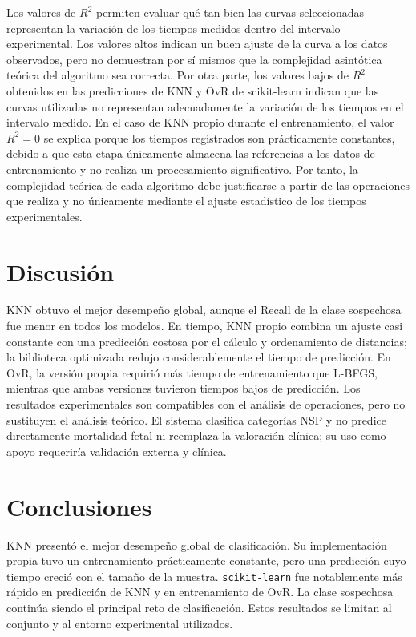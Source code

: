\documentclass[10pt,letterpaper,twocolumn]{article}
\begin{document}
Los valores de $R^2$ permiten evaluar qué tan bien las curvas seleccionadas representan la variación de los tiempos medidos dentro del intervalo experimental. Los valores altos indican un buen ajuste de la curva a los datos observados, pero no demuestran por sí mismos que la complejidad asintótica teórica del algoritmo sea correcta. Por otra parte, los valores bajos de $R^2$ obtenidos en las predicciones de KNN y OvR de scikit-learn indican que las curvas utilizadas no representan adecuadamente la variación de los tiempos en el intervalo medido. En el caso de KNN propio durante el entrenamiento, el valor $R^2 = 0$ se explica porque los tiempos registrados son prácticamente constantes, debido a que esta etapa únicamente almacena las referencias a los datos de entrenamiento y no realiza un procesamiento significativo. Por tanto, la complejidad teórica de cada algoritmo debe justificarse a partir de las operaciones que realiza y no únicamente mediante el ajuste estadístico de los tiempos experimentales.

\section{Discusión}
KNN obtuvo el mejor desempeño global, aunque el Recall de la clase sospechosa fue menor en todos los modelos. En tiempo, KNN propio combina un ajuste casi constante con una predicción costosa por el cálculo y ordenamiento de distancias; la biblioteca optimizada redujo considerablemente el tiempo de predicción. En OvR, la versión propia requirió más tiempo de entrenamiento que L-BFGS, mientras que ambas versiones tuvieron tiempos bajos de predicción. Los resultados experimentales son compatibles con el análisis de operaciones, pero no sustituyen el análisis teórico. El sistema clasifica categorías NSP y no predice directamente mortalidad fetal ni reemplaza la valoración clínica; su uso como apoyo requeriría validación externa y clínica.

\section{Conclusiones}
KNN presentó el mejor desempeño global de clasificación. Su implementación propia tuvo un entrenamiento prácticamente constante, pero una predicción cuyo tiempo creció con el tamaño de la muestra. \texttt{scikit-learn} fue notablemente más rápido en predicción de KNN y en entrenamiento de OvR. La clase sospechosa continúa siendo el principal reto de clasificación. Estos resultados se limitan al conjunto y al entorno experimental utilizados.
\end{document}
